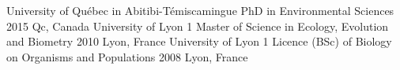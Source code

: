 


\begin{cventries}

  \cventry
    {University of Québec in Abitibi-Témiscamingue} %
        {PhD in Environmental Sciences} %
    {2015} %
{Qc, Canada} %
    {
      \vspace{-\baselineskip}      
    }
     \cventry
        {University of Lyon 1} %
{Master of Science in Ecology, Evolution and Biometry} %
        {2010} %
{Lyon, France} %
    { 
      \vspace{-\baselineskip}
          }
   \cventry
        {University of Lyon 1} %
{Licence (BSc) of Biology on Organisms and Populations} %
        {2008} %
{Lyon, France} %
    {
            \vspace{-5pt}
    }
 
 
\end{cventries}







